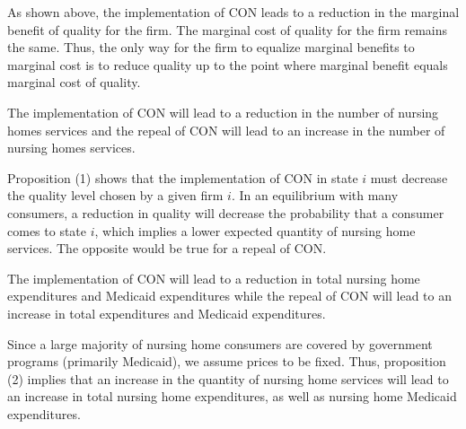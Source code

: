 \documentclass[../Main.tex]{subfiles}
\begin{document}
As shown above, the implementation of CON leads to a reduction in the marginal benefit of quality for the firm. The marginal cost of quality for the firm remains the same. Thus, the only way for the firm to equalize marginal benefits to marginal cost is to reduce quality up to the point where marginal benefit equals marginal cost of quality. 

\begin{Proposition}
The implementation of CON will lead to a reduction in the number of nursing homes services and the repeal of CON will lead to an increase in the number of nursing homes services. 
\end{Proposition}

Proposition (1) shows that the implementation of CON in state $i$ must decrease the quality level chosen by a given firm $i$. In an equilibrium with many consumers, a reduction in quality will decrease the probability that a consumer comes to state $i$, which implies a lower expected quantity of nursing home services. The opposite would be true for a repeal of CON. 

\begin{Proposition}
The implementation of CON will lead to a reduction in total nursing home expenditures and Medicaid expenditures while the repeal of CON will lead to an increase in total expenditures and Medicaid expenditures. 
\end{Proposition}

Since a large majority of nursing home consumers are covered by government programs (primarily Medicaid), we assume prices to be fixed. Thus, proposition (2) implies that an increase in the quantity of nursing home services will lead to an increase in total nursing home expenditures, as well as nursing home Medicaid expenditures.
\end{document}
